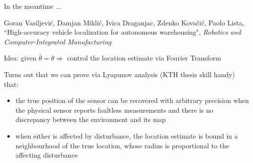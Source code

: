 \begin{frame}{In the meantime ...}

  {\footnotesize
  Goran Vasiljević, Damjan Miklić, Ivica Draganjac, Zdenko Kovačić, Paolo Lista,
  ``High-accuracy vehicle localization for autonomous warehousing", \textit{Robotics and Computer-Integrated Manufacturing}
  }\vspace{1em}

  Idea: given $\hat{\theta} = \theta \Rightarrow$ control the location estimate via Fourier Transform\vspace{1cm}

  Turns out that we can prove via Lyapunov analysis (KTH thesis skill handy) that:
  \begin{itemize}
    \item the true position of the sensor can be recovered with arbitrary precision when the physical sensor reports faultless measurements and there is no discrepancy between the environment and its map
    \item when either is affected by disturbance, the location estimate is bound in a neighbourhood of the true location, whose radius is proportional to the affecting disturbance
  \end{itemize}

\end{frame}
